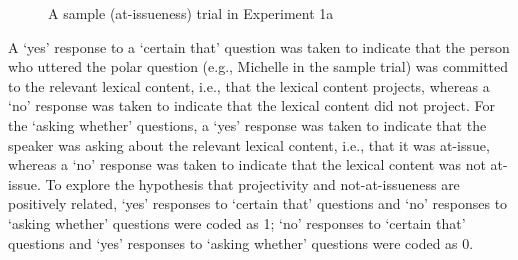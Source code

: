 \documentclass[11pt,fleqn]{article}
\newcommand{\6}{\mbox{$[\hspace*{-.6mm}[$}}
\newcommand{\9}{\mbox{$]\hspace*{-.6mm}]$}}
\begin{document}
\begin{figure}[!h]
\begin{center}
\end{center}
\caption{A sample (at-issueness) trial in Experiment 1a}\label{f-trial-exp1}
\end{figure}

A `yes' response to a `certain that' question was taken to indicate that the person who uttered the polar question (e.g., Michelle in the sample trial) was committed to the relevant lexical content, i.e., that the lexical content projects, whereas a `no' response was taken to indicate that the lexical content did not project. For the `asking whether' questions, a `yes'  response was taken to indicate that the speaker was asking about the relevant lexical content, i.e., that it was at-issue, whereas a `no' response was taken to indicate that the lexical content was not at-issue. To explore the hypothesis that projectivity and not-at-issueness are positively related,  `yes' responses to `certain that' questions and `no' responses to `asking whether' questions were coded as 1; `no' responses to `certain that' questions and `yes' responses to `asking whether' questions were coded as 0.
\end{document}
